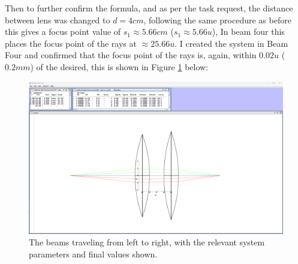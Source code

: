 \documentclass[colorlinks,11pt,a4paper,normalphoto,withhyper,ragged2e]{altareport}
\begin{document}
		\pagebreak
		 
		Then to further confirm the formula, and as per the task request, the distance between lens was changed to $d=4cm$, following the same procedure as before this gives a focus point value of $s_1 \approx 5.66cm$ ($s_1 \approx 5.66u$), In beam four this places the focus point of the rays at $\approx 25.66u$. I created the system in Beam Four and confirmed that the focus point of the rays is, again, within $0.02u$ ($0.2mm$) of the desired, this is shown in Figure \ref{fig:t2b} below: \linebreak
		
		\begin{figure}[h]
			\centering
			\includegraphics[width=0.75\linewidth]{Images/T2b-obj-10cm-d-4cm-Full-Window.png}
			\caption{\centering\footnotesize The beams traveling from left to right, with the relevant system parameters and final values shown.}
			\label{fig:t2b}
		\end{figure}
		
		
\end{document}
